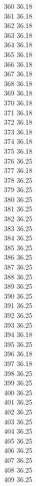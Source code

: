360	36.18\\
361	36.18\\
362	36.18\\
363	36.18\\
364	36.18\\
365	36.18\\
366	36.18\\
367	36.18\\
368	36.18\\
369	36.18\\
370	36.18\\
371	36.18\\
372	36.18\\
373	36.18\\
374	36.18\\
375	36.18\\
376	36.25\\
377	36.18\\
378	36.25\\
379	36.25\\
380	36.25\\
381	36.25\\
382	36.25\\
383	36.25\\
384	36.25\\
385	36.25\\
386	36.25\\
387	36.25\\
388	36.25\\
389	36.25\\
390	36.25\\
391	36.25\\
392	36.25\\
393	36.25\\
394	36.18\\
395	36.25\\
396	36.18\\
397	36.18\\
398	36.25\\
399	36.25\\
400	36.25\\
401	36.25\\
402	36.25\\
403	36.25\\
404	36.25\\
405	36.25\\
406	36.25\\
407	36.25\\
408	36.25\\
409	36.25\\
